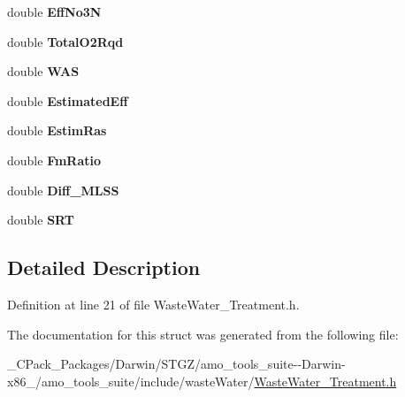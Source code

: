 \begin{DoxyCompactItemize}
\mbox{\label{struct_waste_water___treatment_1_1_calculations_table_a69041c15c83cead6336be9d415a913db}} 
double {\bfseries Eff\+No3N}
\item 
\mbox{\label{struct_waste_water___treatment_1_1_calculations_table_a9bf9b21097e9cd570e63d153ac354ff9}} 
double {\bfseries Total\+O2\+Rqd}
\item 
\mbox{\label{struct_waste_water___treatment_1_1_calculations_table_aded64d640441d8b5b2f137901932f113}} 
double {\bfseries W\+AS}
\item 
\mbox{\label{struct_waste_water___treatment_1_1_calculations_table_adce4f6f89d9919740424233ce81d5caa}} 
double {\bfseries Estimated\+Eff}
\item 
\mbox{\label{struct_waste_water___treatment_1_1_calculations_table_af3d06ba98f75d391a1ca9bb6e9a933a2}} 
double {\bfseries Estim\+Ras}
\item 
\mbox{\label{struct_waste_water___treatment_1_1_calculations_table_a8294ad1d03fe3a43585e8617361b21a5}} 
double {\bfseries Fm\+Ratio}
\item 
\mbox{\label{struct_waste_water___treatment_1_1_calculations_table_a9bf7caa6cd23cc9cd246846d59ada35b}} 
double {\bfseries Diff\+\_\+\+M\+L\+SS}
\item 
\mbox{\label{struct_waste_water___treatment_1_1_calculations_table_ae5946b5c5402e5ac39e610adc8b4f647}} 
double {\bfseries S\+RT}
\end{DoxyCompactItemize}


\subsection{Detailed Description}


Definition at line 21 of file Waste\+Water\+\_\+\+Treatment.\+h.



The documentation for this struct was generated from the following file\+:\begin{DoxyCompactItemize}
\item 
\+\_\+\+C\+Pack\+\_\+\+Packages/\+Darwin/\+S\+T\+G\+Z/amo\+\_\+tools\+\_\+suite-\/-\/\+Darwin-\/x86\+\_/amo\+\_\+tools\+\_\+suite/include/waste\+Water/\hyperlink{___c_pack___packages_2_darwin_2_s_t_g_z_2amo__tools__suite--_darwin-x86__64_2amo__tools__suite_2e397a2091b0b2529235d99ce4a62cd4a}{Waste\+Water\+\_\+\+Treatment.\+h}\end{DoxyCompactItemize}
